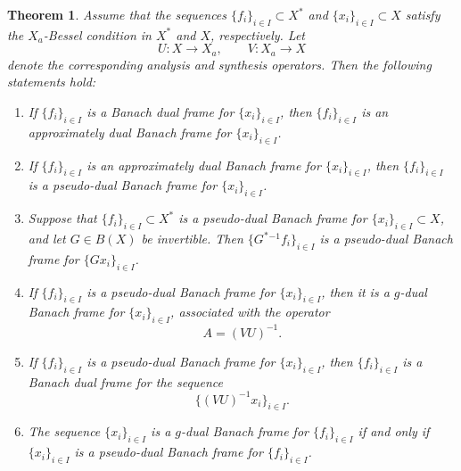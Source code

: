 \documentclass[12pt]{article}
\newtheorem{theorem}{Theorem}[section]
\theoremstyle{definition}
\theoremstyle{remark}
\begin{document}
\begin{theorem}
	Assume that the sequences \(\{f_i\}_{i\in I}\subset X^*\) and
	\(\{x_i\}_{i\in I}\subset X\) satisfy the \(X_a\)-Bessel condition in
	\(X^*\) and \(X\), respectively. Let
	\[
	U:X\to X_a,\qquad V:X_a\to X
	\]
	denote the corresponding analysis and synthesis operators. Then the
	following statements hold:
	
	\begin{enumerate}
		\item If \(\{f_i\}_{i\in I}\) is a Banach dual frame for
		\(\{x_i\}_{i\in I}\), then \(\{f_i\}_{i\in I}\) is an approximately
		dual Banach frame for \(\{x_i\}_{i\in I}\).
		
		\item If \(\{f_i\}_{i\in I}\) is an approximately dual Banach frame
		for \(\{x_i\}_{i\in I}\), then \(\{f_i\}_{i\in I}\) is a pseudo-dual
		Banach frame for \(\{x_i\}_{i\in I}\).
		
		\item Suppose that \(\{f_i\}_{i\in I}\subset X^*\) is a
		pseudo-dual Banach frame for \(\{x_i\}_{i\in I}\subset X\), and let
		\(G\in B(X)\) be invertible. Then \(\{G^*{}^{-1}f_i\}_{i\in I}\)
		is a pseudo-dual Banach frame for \(\{Gx_i\}_{i\in I}\).
		
		\item If \(\{f_i\}_{i\in I}\) is a pseudo-dual Banach frame for
		\(\{x_i\}_{i\in I}\), then it is a \(g\)-dual Banach frame for
		\(\{x_i\}_{i\in I}\), associated with the operator
		\[
		A=(VU)^{-1}.
		\]
		
		\item If \(\{f_i\}_{i\in I}\) is a pseudo-dual Banach frame for
		\(\{x_i\}_{i\in I}\), then \(\{f_i\}_{i\in I}\) is a Banach dual
		frame for the sequence
		\[
		\{(VU)^{-1}x_i\}_{i\in I}.
		\]
		
		\item The sequence \(\{x_i\}_{i\in I}\) is a \(g\)-dual Banach frame
		for \(\{f_i\}_{i\in I}\) if and only if
		\(\{x_i\}_{i\in I}\) is a pseudo-dual Banach frame for
		\(\{f_i\}_{i\in I}\).
	\end{enumerate}
\end{theorem}
\end{document}
